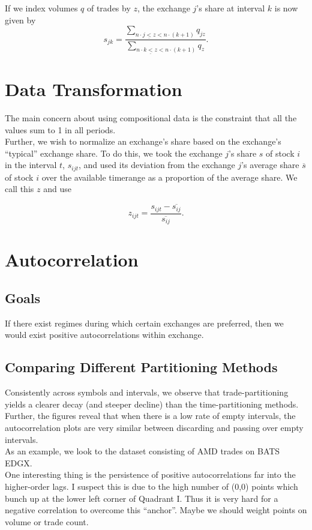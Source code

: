 \documentclass{article}
\begin{document}
If we index volumes $q$ of trades by $z$, the exchange $j$'s share at interval $k$ is now given by
$$s_{jk} = \frac{\sum_{n \cdot j \underline{<} z < n \cdot (k+1)} q_{jz}}{\sum_{n \cdot k \underline{<} z < n \cdot (k+1)}q_{z}}.$$

\section{Data Transformation}
The main concern about using compositional data is the constraint that all the values sum to 1 in all periods.\\

Further, we wish to normalize an exchange's share based on the exchange's ``typical'' exchange share. To do this, we took the exchange $j$'s share $s$ of stock $i$ in the interval $t$, $s_{ijt}$, and used its deviation from the exchange $j$'s average share $\overline{s}$ of stock $i$ over the available timerange as a proportion of the average share. We call this $z$ and use

$$z_{ijt} = \frac{s_{ijt} - \overline{s_{ij}}}{\overline{s_{ij}}}.$$

\section{Autocorrelation}
\subsection{Goals}
If there exist regimes during which certain exchanges are preferred, then we would exist positive autocorrelations within exchange.\\

\subsection{Comparing Different Partitioning Methods}
Consistently across symbols and intervals, we observe that trade-partitioning yields a clearer decay (and steeper decline) than the time-partitioning methods. Further, the figures reveal that when there is a low rate of empty intervals, the autocorrelation plots are very similar between discarding and passing over empty intervals.\\

As an example, we look to the dataset consisting of AMD trades on BATS EDGX.\\

One interesting thing is the persistence of positive autocorrelations far into the higher-order lags. I suspect this is due to the high number of (0,0) points which bunch up at the lower left corner of Quadrant I. Thus it is very hard for a negative correlation to overcome this ``anchor''. Maybe we should weight points on volume or trade count.
\end{document}
